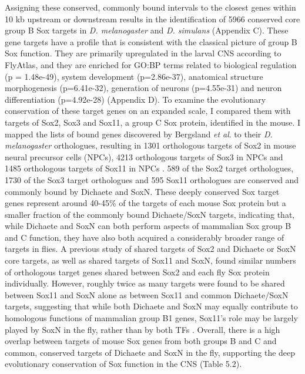 Assigning these conserved, commonly bound intervals to the closest genes within 10 kb upstream or downstream results in the identification of 5966 conserved core group B Sox targets in \emph{D. melanogaster} and \emph{D. simulans} (Appendix C). These gene targets have a profile that is consistent with the classical picture of group B Sox function. They are primarily upregulated in the larval CNS according to FlyAtlas, and they are enriched for GO:BP terms related to biological regulation (p = 1.48e-49), system development (p=2.86e-37), anatomical structure morphogenesis (p=6.41e-32), generation of neurons (p=4.55e-31) and neuron differentiation (p=4.92e-28) (Appendix D). To examine the evolutionary conservation of these target genes on an expanded scale, I compared them with targets of Sox2, Sox3 and Sox11, a group C Sox protein, identified in the mouse. I mapped the lists of bound genes discovered by Bergsland \emph{et al}. to their \emph{D. melanogaster} orthologues, resulting in 1301 orthologous targets of Sox2 in mouse neural precursor cells (NPCs), 4213 orthologous targets of Sox3 in NPCs and 1485 orthologous targets of Sox11 in NPCs \citep{bergsland_sequentially_2011}. 589 of the Sox2 target orthologues, 1730 of the Sox3 target orthologues and 595 Sox11 orthologues are conserved and commonly bound by Dichaete and SoxN. These deeply conserved Sox target genes represent around 40-45\% of the targets of each mouse Sox protein but a smaller fraction of the commonly bound Dichaete/SoxN targets, indicating that, while Dichaete and SoxN can both perform aspects of mammalian Sox group B and C function, they have also both acquired a considerably broader range of targets in flies. A previous study of shared targets of Sox2 and Dichaete or SoxN core targets, as well as shared targets of Sox11 and SoxN, found similar numbers of orthologous target genes shared between Sox2 and each fly Sox protein individually. However, roughly twice as many targets were found to be shared between Sox11 and SoxN alone as between Sox11 and common Dichaete/SoxN targets, suggesting that while both Dichaete and SoxN may equally contribute to homologous functions of mammalian group B1 genes, Sox11's role may be largely played by SoxN in the fly, rather than by both TFs \citep{ferrero_soxneuro_2014}. Overall, there is a high overlap between targets of mouse Sox genes from both groups B and C and common, conserved targets of Dichaete and SoxN in the fly, supporting the deep evolutionary conservation of Sox function in the CNS (Table 5.2).

